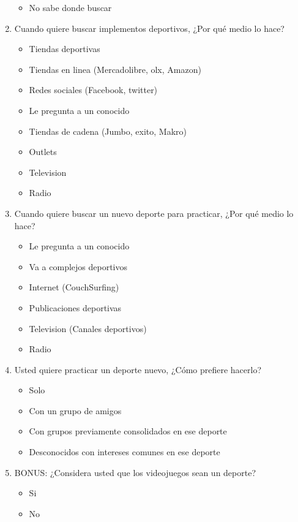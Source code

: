 \begin{enumerate}
\begin{itemize}
    \item No sabe donde buscar
  \end{itemize}
  \item Cuando quiere buscar implementos deportivos, ¿Por qué medio lo hace?
  \begin{itemize}
    \item Tiendas deportivas
    \item Tiendas en linea (Mercadolibre, olx, Amazon)
    \item Redes sociales (Facebook, twitter)
    \item Le pregunta a un conocido
    \item Tiendas de cadena (Jumbo, exito, Makro)
    \item Outlets
    \item Television
    \item Radio
  \end{itemize}
  \item Cuando quiere buscar un nuevo deporte para practicar, ¿Por qué medio lo hace?
  \begin{itemize}
    \item Le pregunta a un conocido
    \item Va a complejos deportivos
    \item Internet (CouchSurfing)
    \item Publicaciones deportivas
    \item Television (Canales deportivos)
    \item Radio
  \end{itemize}
  \item Usted quiere practicar un deporte nuevo, ¿Cómo prefiere hacerlo?
  \begin{itemize}
    \item Solo
    \item Con un grupo de amigos
    \item Con grupos previamente consolidados en ese deporte
    \item Desconocidos con intereses comunes en ese deporte
  \end{itemize}
  \item BONUS: ¿Considera usted que los videojuegos sean un deporte?
  \begin{itemize}
    \item Si
    \item No
  \end{itemize}
\end{enumerate}
